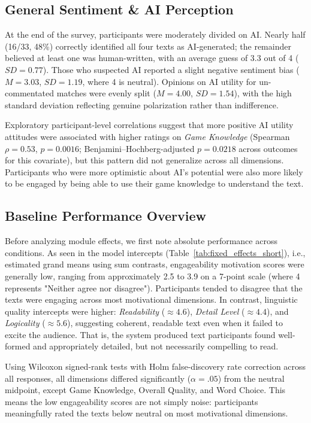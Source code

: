 \subsection{General Sentiment \& AI Perception}
At the end of the survey, participants were moderately divided on AI. Nearly half (16/33, 48\%) correctly identified all four texts as AI-generated; the remainder believed at least one was human-written, with an average guess of 3.3 out of 4 ($SD=0.77$). Those who suspected AI reported a slight negative sentiment bias ($M=3.03$, $SD=1.19$, where 4 is neutral). Opinions on AI utility for un-commentated matches were evenly split ($M=4.00$, $SD=1.54$), with the high standard deviation reflecting genuine polarization rather than indifference.

Exploratory participant-level correlations suggest that more positive AI utility attitudes were associated with higher ratings on \textit{Game Knowledge} (Spearman $\rho=0.53$, $p=0.0016$; Benjamini--Hochberg-adjusted $p=0.0218$ across outcomes for this covariate), but this pattern did not generalize across all dimensions. Participants who were more optimistic about AI's potential were also more likely to be engaged by being able to use their game knowledge to understand the text.


\subsection{Baseline Performance Overview}
Before analyzing module effects, we first note absolute performance across conditions. As seen in the model intercepts (Table~\ref{tab:fixed_effects_short}), i.e., estimated grand means using sum contrasts, engageability motivation scores were generally low, ranging from approximately 2.5 to 3.9 on a 7-point scale (where 4 represents "Neither agree nor disagree"). Participants tended to disagree that the texts were engaging across most motivational dimensions. In contrast, linguistic quality intercepts were higher: \textit{Readability} ($\approx 4.6$), \textit{Detail Level} ($\approx 4.4$), and \textit{Logicality} ($\approx 5.6$), suggesting coherent, readable text even when it failed to excite the audience. That is, the system produced text participants found well-formed and appropriately detailed, but not necessarily compelling to read.

Using Wilcoxon signed-rank tests with Holm false-discovery rate correction across all responses, all dimensions differed significantly ($\alpha = .05$) from the neutral midpoint, except Game Knowledge, Overall Quality, and Word Choice. This means the low engageability scores are not simply noise: participants meaningfully rated the texts below neutral on most motivational dimensions. 

